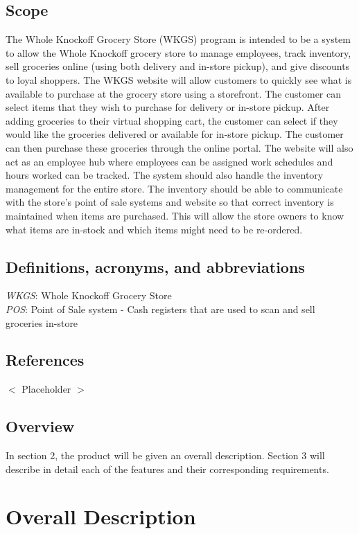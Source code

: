 \documentclass{scrreprt}
\begin{document}
\section{Scope}
The Whole Knockoff Grocery Store (WKGS) program is intended to be a system to allow the Whole Knockoff grocery store to manage employees, track inventory, sell groceries online (using both delivery and in-store pickup), and give discounts to loyal shoppers.  The WKGS website will allow customers to quickly see what is available to purchase at the grocery store using a storefront.  The customer can select items that they wish to purchase for delivery or in-store pickup.  After adding groceries to their virtual shopping cart, the customer can select if they would like the groceries delivered or available for in-store pickup.  The customer can then purchase these groceries through the online portal.  The website will also act as an employee hub where employees can be assigned work schedules and hours worked can be tracked.  The system should also handle the inventory management for the entire store.  The inventory should be able to communicate with the store's point of sale systems and website so that correct inventory is maintained when items are purchased.  This will allow the store owners to know what items are in-stock and which items might need to be re-ordered.

\section{Definitions, acronyms, and abbreviations}
\textit{WKGS}: Whole Knockoff Grocery Store\\
\textit{POS}: Point of Sale system - Cash registers that are used to scan and sell groceries in-store\\


\section{References}
$<$ Placeholder $>$

\section{Overview}
In section 2, the product will be given an overall description.  Section 3 will describe in detail each of the features and their corresponding requirements.   

{\let\clearpage\relax 
\chapter{Overall Description}}
\end{document}
